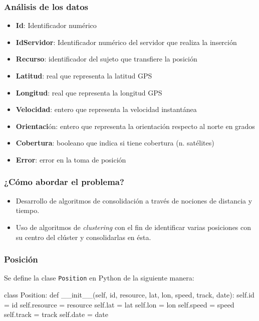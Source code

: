\documentclass[10pt, spanish]{beamer}
\begin{document}
\begin{frame}[fragile]
\frametitle{An\'alisis de los datos}
  \begin{itemize}[<+- | alert@+>]    
\item \textbf{Id}: Identificador num\'erico
\item \textbf{IdServidor}: Identificador num\'erico del servidor que realiza la inserci\'on
\item \textbf{Recurso}: identificador del sujeto que transfiere la posici\'on
\item \textbf{Latitud}: real que representa la latitud GPS
\item \textbf{Longitud}: real que representa la longitud GPS
\item \textbf{Velocidad}: entero que representa la velocidad instant\'anea
\item \textbf{Orientaci}\'on: entero que representa la orientaci\'on respecto al norte en grados
\item \textbf{Cobertura}: booleano que indica si tiene cobertura (n. sat\'elites)
\item \textbf{Error}: error en la toma de posici\'on
  \end{itemize}
\end{frame}

\begin{frame}[fragile]
\frametitle{¿C\'omo abordar el problema?}
\begin{itemize}

\item Desarrollo de algoritmos de consolidaci\'on a trav\'es de nociones de distancia y tiempo.

\item Uso de algoritmos de \textit{clustering} con el fin de identificar varias posiciones con su centro del cl\'uster y consolidarlas en \'esta.

\end{itemize}
\end{frame}


\begin{frame}[fragile]
\frametitle{Posici\'on}
Se define la clase \texttt{Position} en Python de la siguiente manera:\\
\bigskip
\begin{python}
class Position:
    def __init__(self, id, resource, lat, lon, speed, track, date):
        self.id = id
        self.resource = resource
        self.lat = lat
        self.lon = lon
        self.speed = speed
        self.track = track
        self.date = date
\end{python}
\end{frame}
\end{document}
